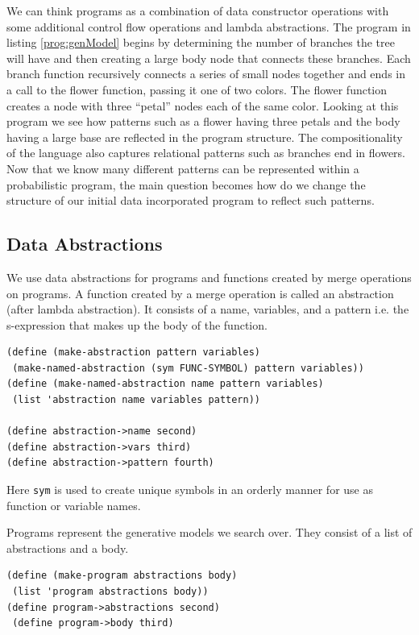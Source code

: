 \documentclass[a4paper,10pt]{article}
\begin{document}
We can think programs as a combination of data constructor operations with some additional control flow operations and lambda abstractions.  The program in listing \ref{prog:genModel} begins by determining the number of branches the tree will have and then creating a large body node that connects these branches.  Each branch function recursively connects a series of small nodes together and ends in a call to the flower function, passing it one of two colors.  The flower function creates a node with three ``petal'' nodes each of the same color.  Looking at this program we see how patterns such as a flower having three petals and the body having a large base are reflected in the program structure.  The compositionality of the language also captures relational patterns such as branches end in flowers.  Now that we know many different patterns can be represented within a probabilistic program, the main question becomes how do we change the structure of our initial data incorporated program to reflect such patterns.

\subsection{Data Abstractions}
We use data abstractions for programs and functions created by merge operations on programs.  A function created by a merge operation is called an abstraction (after lambda abstraction).  It consists of a name, variables, and a pattern i.e. the s-expression that makes up the body of the function.  
\begin{lstlisting}[frame=trBL]
(define (make-abstraction pattern variables)
 (make-named-abstraction (sym FUNC-SYMBOL) pattern variables))
(define (make-named-abstraction name pattern variables)
 (list 'abstraction name variables pattern))

(define abstraction->name second)
(define abstraction->vars third)
(define abstraction->pattern fourth)
\end{lstlisting}
Here \texttt{sym} is used to create unique symbols in an orderly manner for use as function or variable names.


Programs represent the generative models we search over.  They consist of a list of abstractions and a body.
\begin{lstlisting}[frame=trBL]
(define (make-program abstractions body)
 (list 'program abstractions body))
(define program->abstractions second)
 (define program->body third)
\end{lstlisting}  
\end{document}
